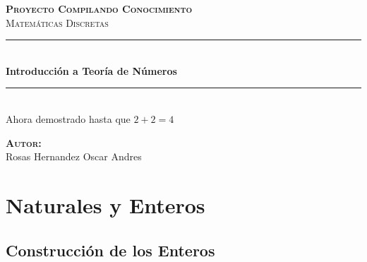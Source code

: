 \documentclass[12pt, fleqn]{report}                             %
\author{Oscar Andrés Rosas}                                     %
\begin{document}
\begin{titlepage}

    \center
    \textbf{\textsc{\Large Proyecto Compilando Conocimiento}}\\[1.0cm] 
    \textsc{\Large Matemáticas Discretas}\\[1.0cm] 

    \rule{\linewidth}{0.5mm} \\[1.0cm]
        { \huge \bfseries Introducción a Teoría de Números}\\[1.0cm] 
    \rule{\linewidth}{0.5mm} \\[2.0cm]
    
    {\LARGE Ahora demostrado hasta que $2 + 2 = 4$}\\[7cm] 
    
    \begin{center} \large
    \textbf{\textsc{Autor:}}\\
       Rosas Hernandez Oscar Andres
    \end{center}

    \vfill

\end{titlepage}

\tableofcontents{}
\label{sec:Index}

\clearpage










\chapter{Naturales y Enteros}
    \clearpage


    \section{Construcción de los Enteros}
\end{document}

